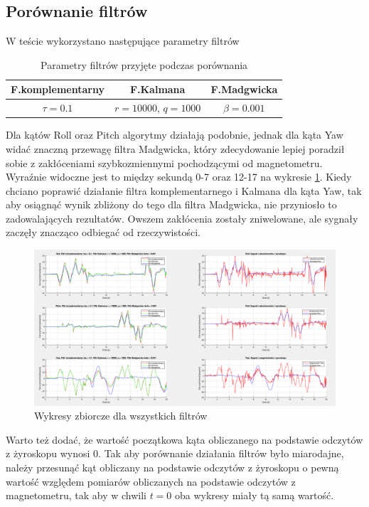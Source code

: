 \subsection{Porównanie filtrów}

W teście wykorzystano następujące parametry filtrów
\begin{table}[h!]
    \centering
    \begin{tabular}{|c|c|c|}
        \hline
        F.komplementarny & F.Kalmana & F.Madgwicka \\
        \hline
        $\tau = 0.1$ & $r = 10000$, $q = 1000$ & $\beta = 0.001$ \\
        \hline
    \end{tabular}
    
     \caption{Parametry filtrów przyjęte podczas porównania}
\end{table}

Dla kątów Roll oraz Pitch algorytmy działają podobnie, jednak dla kąta Yaw widać znaczną przewagę filtra Madgwicka, który zdecydowanie lepiej poradził sobie z zakłóceniami szybkozmiennymi pochodzącymi od magnetometru. Wyraźnie widoczne jest to między sekundą 0-7 oraz 12-17 na wykresie \ref{Porownanie}. Kiedy chciano poprawić działanie filtra komplementarnego i Kalmana dla kąta Yaw, tak aby osiągnąć wynik zbliżony do tego dla filtra Madgwicka, nie przyniosło to zadowalających rezultatów. Owszem zakłócenia zostały zniwelowane, ale sygnały zaczęły znacząco odbiegać od rzeczywistości. 

\begin{figure}[h!]
    \centering
    \includegraphics[width=1\textwidth]{Rysunki/Rozdzial04/Porownanie.png}
    \caption{Wykresy zbiorcze dla wszystkich filtrów}
    \label{Porownanie}
\end{figure}

Warto też dodać, że wartość początkowa kąta obliczanego na podstawie odczytów z żyroskopu wynosi 0. Tak aby porównanie działania filtrów było miarodajne, należy przesunąć kąt obliczany na podstawie odczytów z żyroskopu o pewną wartość względem pomiarów obliczanych na podstawie odczytów z magnetometru, tak aby w chwili $t = 0$ oba wykresy miały tą samą wartość.